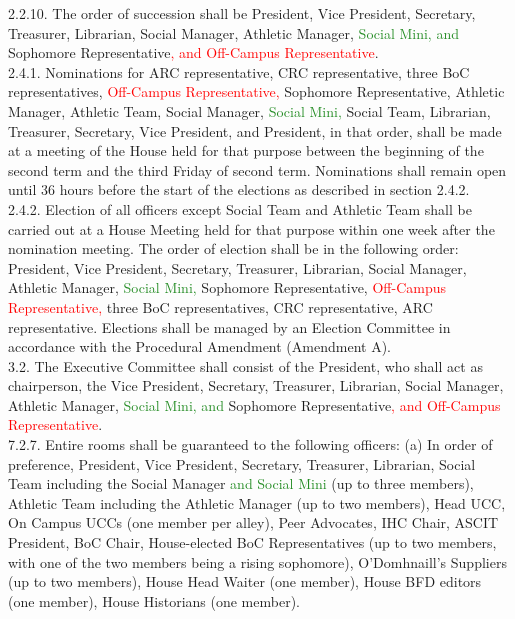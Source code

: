 \documentclass[10pt]{article} %
\begin{document}
\begin{itemize}
	2.2.10. The order of succession shall be President, Vice President, Secretary, Treasurer, Librarian, Social Manager, Athletic Manager, \textcolor{ForestGreen}{Social Mini, and} Sophomore Representative\textcolor{red}{, and Off-Campus Representative}. \\
	2.4.1. Nominations for ARC representative, CRC representative, three BoC representatives, \textcolor{red}{Off-Campus Representative,} Sophomore Representative, Athletic Manager, Athletic Team, Social Manager, \textcolor{ForestGreen}{Social Mini,} Social Team, Librarian, Treasurer, Secretary, Vice President, and President, in that order, shall be made at a meeting of the House held for that purpose between the beginning of the second term and the third Friday of second term. Nominations shall remain open until 36 hours before the start of the elections as described in section 2.4.2. \\
	2.4.2. Election of all officers except Social Team and Athletic Team shall be carried out at a House Meeting held for that purpose within one week after the nomination meeting. The order of election shall be in the following order: President, Vice President, Secretary, Treasurer, Librarian, Social Manager, Athletic Manager, \textcolor{ForestGreen}{Social Mini,} Sophomore Representative, \textcolor{red}{Off-Campus Representative,} three BoC representatives, CRC representative, ARC representative. Elections shall be managed by an Election Committee in accordance with the Procedural Amendment (Amendment A). \\
	3.2. The Executive Committee shall consist of the President, who shall act as chairperson, the Vice President, Secretary, Treasurer, Librarian, Social Manager, Athletic Manager, \textcolor{ForestGreen}{Social Mini, and} Sophomore Representative\textcolor{red}{, and Off-Campus Representative}. \\
	7.2.7. Entire rooms shall be guaranteed to the following officers: (a) In order of preference, President, Vice President, Secretary, Treasurer, Librarian, Social Team including the Social Manager \textcolor{ForestGreen}{and Social Mini} (up to three members), Athletic Team including the Athletic Manager (up to two members), Head UCC, On Campus UCCs (one member per alley), Peer Advocates, IHC Chair, ASCIT President, BoC Chair, House-elected BoC Representatives (up to two members, with one of the two members being a rising sophomore), O'Domhnaill's Suppliers (up to two members), House Head Waiter (one member), House BFD editors (one member), House Historians (one member). \\

\end{itemize}
\end{document}
